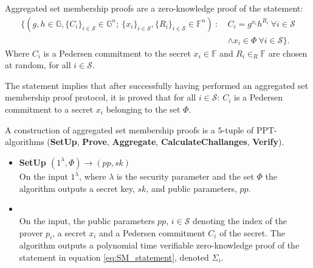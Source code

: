 \vspace{10pt}
\begin{Mydef}
\label{def:GeneralAggregation}
Aggregated set membership proofs are a zero-knowledge proof of the statement:
\begin{equation}
\begin{aligned} 
\label{eq:SMagg_statement}
    \big\{(g,h\in\mathds{G},\{C_i\}_{i\in\mathcal{S}}\in\mathds{G}^n;\:\{x_i\}_{i\in\mathcal{S}},\{R_i\}_{i\in\mathcal{S}}\in\mathds{F}^n)\:: 
\:  &C_i  =   g^{x_i} h^{R_i} \:\forall i \in\mathcal{S}
 \\
 &\wedge x_i \in \Phi \: \forall i\in\mathcal{S} \big\}.
\end{aligned}
\end{equation}
Where $C_i$ is a Pedersen commitment to the secret $x_i\in\mathds{F}$ and $R_i \in_R\mathds{F}$ are chosen at random, for all $i\in\mathcal{S}$.  

The statement implies that after successfully having performed an aggregated set membership proof protocol, it is proved that 
for all $i\in\mathcal{S}$: $C_i$ is a Pedersen commitment to a secret $x_i$ belonging to the set $\Phi$.

A construction of aggregated set membership proofs is a $5$-tuple of PPT-algorithms (\textbf{SetUp}, \textbf{Prove}, \textbf{Aggregate}, \textbf{CalculateChallanges}, \textbf{Verify}).
\\
\begin{itemize}
  \item\textbf{SetUp $(1^\lambda, \Phi)\xrightarrow[]{}(pp,sk)$}\\
On the input $1^\lambda$, where $\lambda$ is the security parameter and the set $\Phi$ the algorithm outputs a secret key, $sk$, and public parameters, $pp$. 

\item{}\\
On the input, the public parameters $pp$, $i\in\mathcal{S}$ denoting the index of the prover $p_i$, a secret $x_i$ and a Pedersen commitment $C_i$ of the secret.  The algorithm outputs a polynomial time verifiable zero-knowledge proof of the statement in equation \eqref{eq:SM_statement}, denoted $\Sigma_i$.


\end{itemize}
\end{Mydef}
